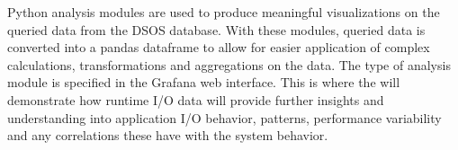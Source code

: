 Python analysis modules are used to produce meaningful visualizations on the queried data from the DSOS database. With these modules, queried data is converted into a pandas dataframe to allow for easier application of complex calculations, transformations and aggregations on the data. The type of analysis module is specified in the Grafana web interface. This is where the \Darshan will demonstrate how runtime I/O data will provide further insights and understanding into application I/O behavior, patterns, performance variability and any correlations these have with the system behavior.   

